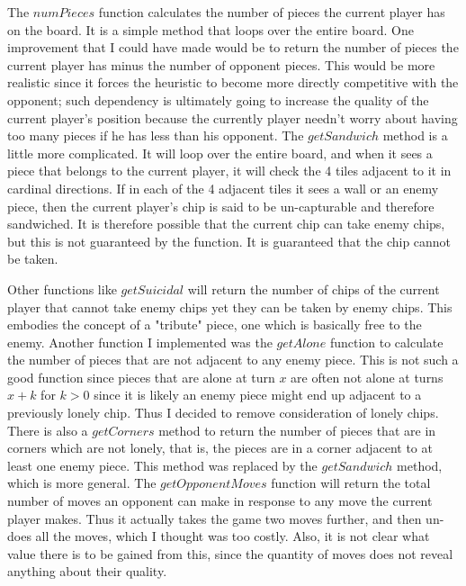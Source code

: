 \documentclass[12pt]{article}
\begin{document}
The $numPieces$ function calculates the number of pieces the current player has on the board. It is a simple method that loops over the entire board. One improvement that I could have made would be to return the number of pieces the current player has minus the number of opponent pieces. This would be more realistic since it forces the heuristic to become more directly competitive with the opponent; such dependency is ultimately going to increase the quality of the current player's position because the currently player needn't worry about having too many pieces if he has less than his opponent. The $getSandwich$ method is a little more complicated. It will loop over the entire board, and when it sees a piece that belongs to the current player, it will check the 4 tiles adjacent to it in cardinal directions. If in each of the 4 adjacent tiles it sees a wall or an enemy piece, then the current player's chip is said to be un-capturable and therefore sandwiched. It is therefore possible that the current chip can take enemy chips, but this is not guaranteed by the function. It is guaranteed that the chip cannot be taken. 

Other functions like $getSuicidal$ will return the number of chips of the current player that cannot take enemy chips yet they can be taken by enemy chips. This embodies the concept of a "tribute" piece, one which is basically free to the enemy. Another function I implemented was the $getAlone$ function to calculate the number of pieces that are not adjacent to any enemy piece. This is not such a good function since pieces that are alone at turn $x$ are often not alone at turns $x + k$ for $k > 0$ since it is likely an enemy piece might end up adjacent to a previously lonely chip. Thus I decided to remove consideration of lonely chips. There is also a $getCorners$ method to return the number of pieces that are in corners which are not lonely, that is, the pieces are in a corner adjacent to at least one enemy piece. This method was replaced by the $getSandwich$ method, which is more general. The $getOpponentMoves$ function will return the total number of moves an opponent can make in response to any move the current player makes. Thus it actually takes the game two moves further, and then un-does all the moves, which I thought was too costly. Also, it is not clear what value there is to be gained from this, since the quantity of moves does not reveal anything about their quality.
\end{document}
